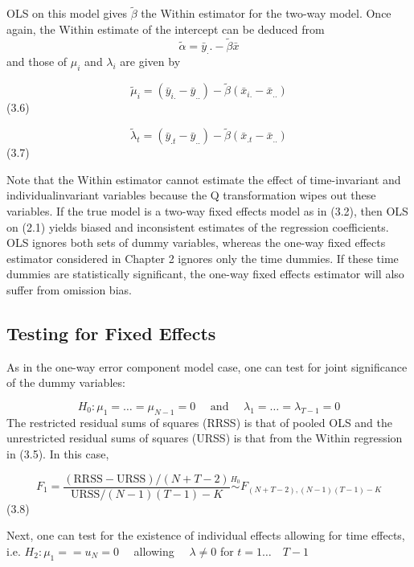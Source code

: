 \documentclass[
]{book}
\begin{document}
OLS on this model gives \(\widetilde {\beta}\) the Within estimator for the two-way model. Once again, the
Within estimate of the intercept can be deduced from
\[\widetilde {\alpha}=\bar{y}_..-\widetilde {\beta} \bar{x}  \]
and those of \(\mu_i\) and \(\lambda_i\) are given by

\begin{equation}
\tilde{\mu}_{i}=\left(\bar{y}_{i .}-\bar{y}_{. .}\right)-\widetilde{\beta}\left(\bar{x}_{i .}-\bar{x}_{. .}\right)
\end{equation} (3.6)

\begin{equation}
\tilde{\lambda}_{t}=\left(\bar{y}_{. t}-\bar{y}_{. .}\right)-\widetilde{\beta}\left(\bar{x}_{. t}-\bar{x}_{. .}\right)
\end{equation} (3.7)

Note that the Within estimator cannot estimate the effect of time-invariant and individualinvariant variables because the Q transformation wipes out these variables. If the true model
is a two-way fixed effects model as in (3.2), then OLS on (2.1) yields biased and inconsistent estimates of the regression coefficients. OLS ignores both sets of dummy variables, whereas the one-way fixed effects estimator considered in Chapter 2 ignores only the time dummies. If
these time dummies are statistically significant, the one-way fixed effects estimator will also
suffer from omission bias.

\hypertarget{testing-for-fixed-effects}{%
\subsection{Testing for Fixed Effects}\label{testing-for-fixed-effects}}

As in the one-way error component model case, one can test for joint significance of the dummy
variables:

\[
H_{0}: \mu_{1}=\ldots=\mu_{N-1}=0 \quad \text { and } \quad \lambda_{1}=\ldots=\lambda_{T-1}=0
\]
The restricted residual sums of squares (RRSS) is that of pooled OLS and the unrestricted residual sums of squares (URSS) is that from the Within regression in (3.5). In this case,

\begin{equation}
F_{1}=\frac{(\mathrm{RRSS}-\mathrm{URSS}) /(N+T-2)}{\mathrm{URSS} /(N-1)(T-1)-K} \stackrel{H_{0}}{\sim} F_{(N+T-2),(N-1)(T-1)-K}
\end{equation} (3.8)

Next, one can test for the existence of individual effects allowing for time effects, i.e.
\(H_{2}: \mu_{1}==u_{N}=0 \quad\) allowing \(\quad \lambda \neq 0\) for \(t=1 \ldots \quad T-1\)
\end{document}
